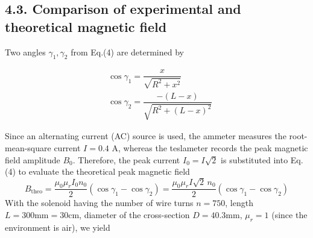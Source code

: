 \documentclass[12pt,oneside,a4paper]{article}
\theoremstyle{definition}
\begin{document}
	\subsection*{4.3. Comparison of experimental and theoretical magnetic field }
	
	\noindent
	Two angles $\gamma_1, \gamma_2$ from Eq.(4) are determined by
	\begin{center}
		\vspace{-0.8cm}
		\begin{displaymath}
			\begin{aligned}
				&\cos \gamma_1 = \dfrac{x}{\sqrt{R^2 + x^2}} \\
				&\cos \gamma_2 = \dfrac{-\left(L - x\right)}{\sqrt{R^2 + (L - x)^2}} 
			\end{aligned}
		\end{displaymath}
	\end{center}
	Since an alternating current (AC) source is used, the ammeter measures the root-mean-square current $I = 0.4\text{ A}$, whereas the teslameter records the peak magnetic field amplitude $B_0$. Therefore, the peak current $I_0 = I\sqrt{2}$ is substituted into Eq.(4) to evaluate the theoretical peak magnetic field
	\begin{equation*}
		B_{\text{theo}} = \frac{\mu_0 \mu_r I_0 n_0}{2} (\cos\gamma_1 - \cos\gamma_2) = \frac{\mu_0 \mu_r I\sqrt{2}\, n_0}{2} (\cos\gamma_1 - \cos\gamma_2)
	\end{equation*}
	\noindent
	 With the solenoid having the number of wire turns $n = 750$, length $L = 300\text{mm} = 30\text{cm}$, diameter of the cross-section $D = 40.3\text{mm}$, $\mu_r = 1$ (since the environment is air), we yield
	\begin{center}
	\end{center}
\end{document}
